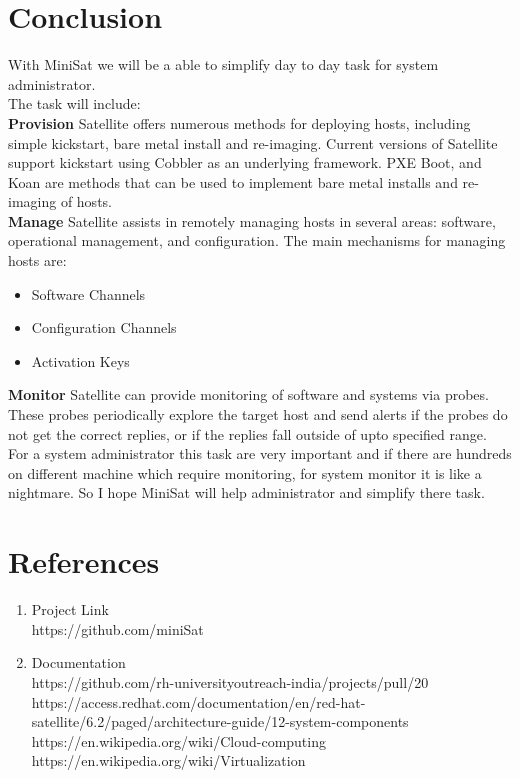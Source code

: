 \documentclass[a4paper,12pt]{report}
\begin{document}
\chapter{Conclusion}
With MiniSat we will  be a able to simplify day to day task for system administrator.\\
The task will include: \\
\newline
\textbf{Provision}
Satellite offers numerous methods for deploying hosts, including simple kickstart, bare metal install and re-imaging. Current versions of Satellite support kickstart using Cobbler as an underlying framework. PXE Boot, and Koan are methods that can be used to implement bare metal installs and re-imaging of hosts. \\
\newline
\textbf{Manage}
Satellite assists in remotely managing hosts in several areas: software, operational management, and configuration. The main mechanisms for managing hosts are:
\begin{itemize}
	\item Software Channels
	\item Configuration Channels
	\item Activation Keys\\
\end{itemize}
\textbf{Monitor}
Satellite can provide monitoring of software and systems via probes. These probes periodically explore the target host and send alerts if the probes do not get the correct replies, or if the replies fall outside of upto specified range.\\
\newline
For a system administrator this task are very important and if there are hundreds on different machine which require monitoring, for system monitor it is like a nightmare. So I hope MiniSat will help administrator and simplify there task.

\chapter{References}
\begin{enumerate}
	\item Project Link\\
	\newline
	https://github.com/miniSat
	
	\item Documentation\\
	\newline
	https://github.com/rh-universityoutreach-india/projects/pull/20\\
	https://access.redhat.com/documentation/en/red-hat-satellite/6.2/paged/architecture-guide/12-system-components\\
	https://en.wikipedia.org/wiki/Cloud-computing\\
	https://en.wikipedia.org/wiki/Virtualization\\
	
\end{enumerate}
\end{document}

